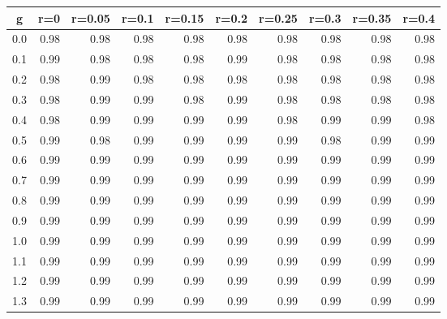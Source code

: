 %
\begin{table}[!tbp]
 \begin{center}
 \begin{tabular}{rrrrrrrrrr}\hline\hline
\multicolumn{1}{c}{g}&\multicolumn{1}{c}{r=0}&\multicolumn{1}{c}{r=0.05}&\multicolumn{1}{c}{r=0.1}&\multicolumn{1}{c}{r=0.15}&\multicolumn{1}{c}{r=0.2}&\multicolumn{1}{c}{r=0.25}&\multicolumn{1}{c}{r=0.3}&\multicolumn{1}{c}{r=0.35}&\multicolumn{1}{c}{r=0.4}\tabularnewline
\hline
0.0&0.98&0.98&0.98&0.98&0.98&0.98&0.98&0.98&0.98\tabularnewline
0.1&0.99&0.98&0.98&0.98&0.99&0.98&0.98&0.98&0.98\tabularnewline
0.2&0.98&0.99&0.98&0.98&0.98&0.98&0.98&0.98&0.98\tabularnewline
0.3&0.98&0.99&0.99&0.98&0.99&0.98&0.98&0.98&0.98\tabularnewline
0.4&0.98&0.99&0.99&0.99&0.99&0.98&0.99&0.99&0.98\tabularnewline
0.5&0.99&0.98&0.99&0.99&0.99&0.99&0.98&0.99&0.99\tabularnewline
0.6&0.99&0.99&0.99&0.99&0.99&0.99&0.99&0.99&0.99\tabularnewline
0.7&0.99&0.99&0.99&0.99&0.99&0.99&0.99&0.99&0.99\tabularnewline
0.8&0.99&0.99&0.99&0.99&0.99&0.99&0.99&0.99&0.99\tabularnewline
0.9&0.99&0.99&0.99&0.99&0.99&0.99&0.99&0.99&0.99\tabularnewline
1.0&0.99&0.99&0.99&0.99&0.99&0.99&0.99&0.99&0.99\tabularnewline
1.1&0.99&0.99&0.99&0.99&0.99&0.99&0.99&0.99&0.99\tabularnewline
1.2&0.99&0.99&0.99&0.99&0.99&0.99&0.99&0.99&0.99\tabularnewline
1.3&0.99&0.99&0.99&0.99&0.99&0.99&0.99&0.99&0.99\tabularnewline
\hline
\end{tabular}

\end{center}

\end{table}

